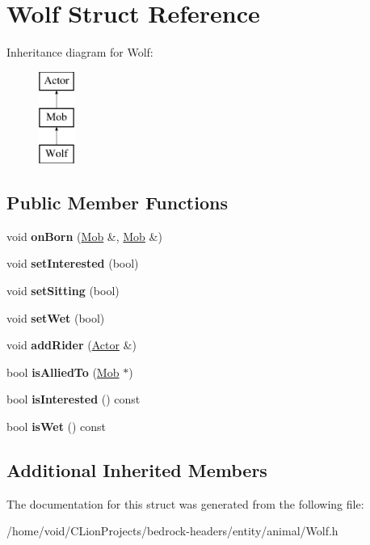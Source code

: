 \hypertarget{struct_wolf}{}\section{Wolf Struct Reference}
\label{struct_wolf}
Inheritance diagram for Wolf\+:\begin{figure}[H]
\begin{center}
\leavevmode
\includegraphics[height=3.000000cm]{struct_wolf}
\end{center}
\end{figure}
\subsection*{Public Member Functions}
\begin{DoxyCompactItemize}
\item 
\mbox{\label{struct_wolf_abfc7d2afa7a4cc88e546312ed03876f9}} 
void {\bfseries on\+Born} (\mbox{\hyperlink{struct_mob}{Mob}} \&, \mbox{\hyperlink{struct_mob}{Mob}} \&)
\item 
\mbox{\label{struct_wolf_a2cc82fadc9585d6d4858edd6c3818d7d}} 
void {\bfseries set\+Interested} (bool)
\item 
\mbox{\label{struct_wolf_a6ef3138164c0f881dda5c2500268043b}} 
void {\bfseries set\+Sitting} (bool)
\item 
\mbox{\label{struct_wolf_a7c2ea8ca606ba5c506e642b54120c2a0}} 
void {\bfseries set\+Wet} (bool)
\item 
\mbox{\label{struct_wolf_a18bf15470f98e34122279b333117cdd3}} 
void {\bfseries add\+Rider} (\mbox{\hyperlink{struct_actor}{Actor}} \&)
\item 
\mbox{\label{struct_wolf_a7e9f443d92fa61ed1fe60383796d486b}} 
bool {\bfseries is\+Allied\+To} (\mbox{\hyperlink{struct_mob}{Mob}} $\ast$)
\item 
\mbox{\label{struct_wolf_ad503245d3886b3848826d410fb23b9e3}} 
bool {\bfseries is\+Interested} () const
\item 
\mbox{\label{struct_wolf_a430946abdbed4325d43ecb01874c5669}} 
bool {\bfseries is\+Wet} () const
\end{DoxyCompactItemize}
\subsection*{Additional Inherited Members}


The documentation for this struct was generated from the following file\+:\begin{DoxyCompactItemize}
\item 
/home/void/\+C\+Lion\+Projects/bedrock-\/headers/entity/animal/Wolf.\+h\end{DoxyCompactItemize}
